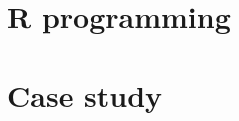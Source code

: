 \documentclass[aspectratio=1610,10pt,xcolor=x11names]{beamer}
\theoremstyle{plain}
\theoremstyle{definition}
\begin{document}




\part{R programming}
\frame{\partpage}










\part{Case study}
\frame{\partpage}







\end{document}
